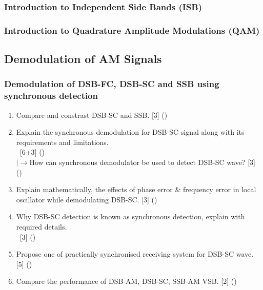 \documentclass[12pt]{article}
\newcommand{\lb}{\\$\left|\rightarrow\right.$}
\newcommand{\enter}{\\\textcolor{white}{1}}
\begin{document}
    \subsubsection{Introduction to Independent Side Bands (ISB)}
    \subsubsection{Introduction to Quadrature Amplitude Modulations (QAM)}
  \subsection{Demodulation of AM Signals}
    \subsubsection{Demodulation of DSB-FC, DSB-SC and SSB using synchronous detection}
      \begin{enumerate}
        \item Compare and constrast DSB-SC and SSB. \hfill [3] ()

        \item Explain the synchronous demodulation for DSB-SC signal along with its requirements and limitations.
        \enter\hfill [6+3] ()
        \lb How can synchronous demodulator be used to detect DSB-SC wave? \hfill [3] ()

        \item Explain mathematically, the effects of phase error \& frequency error in local oscillator while demodulating DSB-SC. \hspace{13cm} [3] ()

        \item Why DSB-SC detection is known as synchronous detection, explain with required details.
        \enter\hfill [3] ()

        \item Propose one of practically synchronised receiving system for DSB-SC wave. \hfill [5] ()

        \item Compare the performance of DSB-AM, DSB-SC, SSB-AM VSB. \hfill [2] ()
      \end{enumerate}
\end{document}
